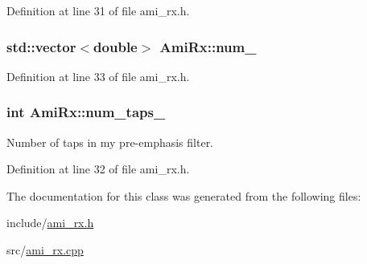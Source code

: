 Definition at line 31 of file ami\+\_\+rx.\+h.

\hypertarget{class_ami_rx_aae9534ddd94ec489921ee1ebb534e38b}{}
\subsubsection[{num\+\_\+}]{\setlength{\rightskip}{0pt plus 5cm}std\+::vector$<$double$>$ Ami\+Rx\+::num\+\_\+\hspace{0.3cm}{\ttfamily [protected]}}\label{class_ami_rx_aae9534ddd94ec489921ee1ebb534e38b}


Definition at line 33 of file ami\+\_\+rx.\+h.

\hypertarget{class_ami_rx_a3e41b1552492931a0da2ada55d894f82}{}
\subsubsection[{num\+\_\+taps\+\_\+}]{\setlength{\rightskip}{0pt plus 5cm}int Ami\+Rx\+::num\+\_\+taps\+\_\+\hspace{0.3cm}{\ttfamily [protected]}}\label{class_ami_rx_a3e41b1552492931a0da2ada55d894f82}


Number of taps in my pre-\/emphasis filter. 



Definition at line 32 of file ami\+\_\+rx.\+h.



The documentation for this class was generated from the following files\+:\begin{DoxyCompactItemize}
\item 
include/\hyperlink{ami__rx_8h}{ami\+\_\+rx.\+h}\item 
src/\hyperlink{ami__rx_8cpp}{ami\+\_\+rx.\+cpp}\end{DoxyCompactItemize}
